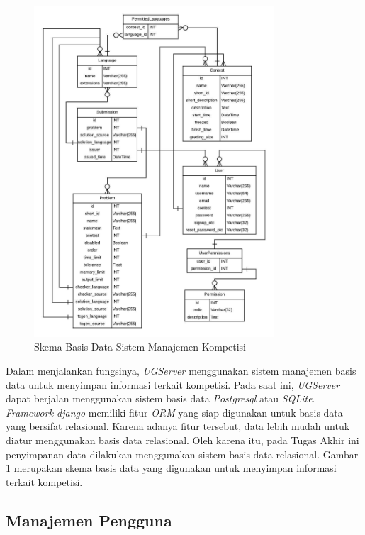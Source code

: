 \begin{figure}[ht!]
    \centering
    \includegraphics[width=0.8\textwidth]{images/dbschemas}
    \caption{Skema Basis Data Sistem Manajemen Kompetisi}
    \label{fig:dbschemas}
\end{figure}

\par Dalam menjalankan fungsinya, \textit{UGServer} menggunakan sistem manajemen basis data untuk menyimpan informasi terkait kompetisi. Pada saat ini, \textit{UGServer} dapat berjalan menggunakan sistem basis data \textit{Postgresql} atau \textit{SQLite}. \textit{Framework django} memiliki fitur \textit{ORM} yang siap digunakan untuk basis data yang bersifat relasional. Karena adanya fitur tersebut, data lebih mudah untuk diatur menggunakan basis data relasional. Oleh karena itu, pada Tugas Akhir ini penyimpanan data dilakukan menggunakan sistem basis data relasional. Gambar \ref{fig:dbschemas} merupakan skema basis data yang digunakan untuk menyimpan informasi terkait kompetisi.

\subsection{Manajemen Pengguna} \label{subsec:user-management}

